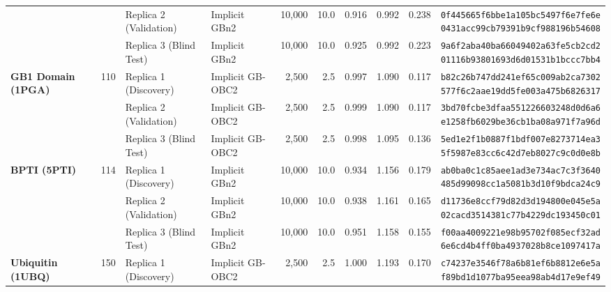 \documentclass[10pt,letterpaper]{article}
\begin{document}
{\begin{longtable}{@{}l c l l r r c c c l@{}}
 &  & Replica 2 (Validation) & Implicit GBn2 & 10,000 & 10.0 & 0.916 & 0.992 & 0.238 & \shortstack[l]{\texttt{0f445665f6bbe1a105bc5497f6e7fe6e}\\\texttt{0431acc99cb79391b9cf988196b54608}} \\

 &  & Replica 3 (Blind Test) & Implicit GBn2 & 10,000 & 10.0 & 0.925 & 0.992 & 0.223 & \shortstack[l]{\texttt{9a6f2aba40ba66049402a63fe5cb2cd2}\\\texttt{01116b93801693d6d01531b1bccc7bb4}} \\
\midrule[0.35pt]
\textbf{GB1 Domain (1PGA)} & 110 & Replica 1 (Discovery) & Implicit GB-OBC2 & 2,500 & 2.5 & 0.997 & 1.090 & 0.117 & \shortstack[l]{\texttt{b82c26b747dd241ef65c009ab2ca7302}\\\texttt{577f6c2aae19dd5fe003a475b6826317}} \\

 &  & Replica 2 (Validation) & Implicit GB-OBC2 & 2,500 & 2.5 & 0.999 & 1.090 & 0.117 & \shortstack[l]{\texttt{3bd70fcbe3dfaa551226603248d0d6a6}\\\texttt{e1258fb6029be36cb1ba08a971f7a96d}} \\

 &  & Replica 3 (Blind Test) & Implicit GB-OBC2 & 2,500 & 2.5 & 0.998 & 1.095 & 0.136 & \shortstack[l]{\texttt{5ed1e2f1b0887f1bdf007e8273714ea3}\\\texttt{5f5987e83cc6c42d7eb8027c9c0d0e8b}} \\
\midrule[0.35pt]
\textbf{BPTI (5PTI)} & 114 & Replica 1 (Discovery) & Implicit GBn2 & 10,000 & 10.0 & 0.934 & 1.156 & 0.179 & \shortstack[l]{\texttt{ab0ba0c1c85aee1ad3e734ac7c3f3640}\\\texttt{485d99098cc1a5081b3d10f9bdca24c9}} \\

 &  & Replica 2 (Validation) & Implicit GBn2 & 10,000 & 10.0 & 0.938 & 1.161 & 0.165 & \shortstack[l]{\texttt{d11736e8ccf79d82d3d194800e045e5a}\\\texttt{02cacd3514381c77b4229dc193450c01}} \\

 &  & Replica 3 (Blind Test) & Implicit GBn2 & 10,000 & 10.0 & 0.951 & 1.158 & 0.155 & \shortstack[l]{\texttt{f00aa4009221e98b95702f085ecf32ad}\\\texttt{6e6cd4b4ff0ba4937028b8ce1097417a}} \\
\midrule[0.35pt]
\textbf{Ubiquitin (1UBQ)} & 150 & Replica 1 (Discovery) & Implicit GB-OBC2 & 2,500 & 2.5 & 1.000 & 1.193 & 0.170 & \shortstack[l]{\texttt{c74237e3546f78a6b81ef6b8812e6e5a}\\\texttt{f89bd1d1077ba95eea98ab4d17e9ef49}} \\


\end{longtable}}
\end{document}
